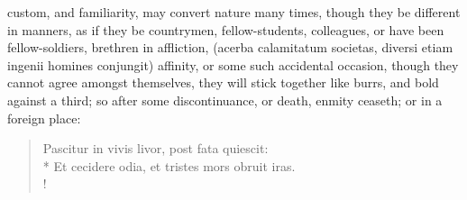 {custom, and familiarity, may convert nature many times, though they be
different in manners, as if they be countrymen, fellow-students,
colleagues, or have been fellow-soldiers, brethren in affliction,
(acerba calamitatum societas, diversi etiam ingenii homines
conjungit) affinity, or some such accidental occasion, though they
cannot agree amongst themselves, they will stick together like burrs,
and bold against a third; so after some discontinuance, or death,
enmity ceaseth; or in a foreign place:
%
\begin{latin}
\begin{verse}
Pascitur in vivis livor, post fata quiescit:\\*
Et cecidere odia, et tristes mors obruit iras.\\!
\end{verse}
\end{latin}

}
